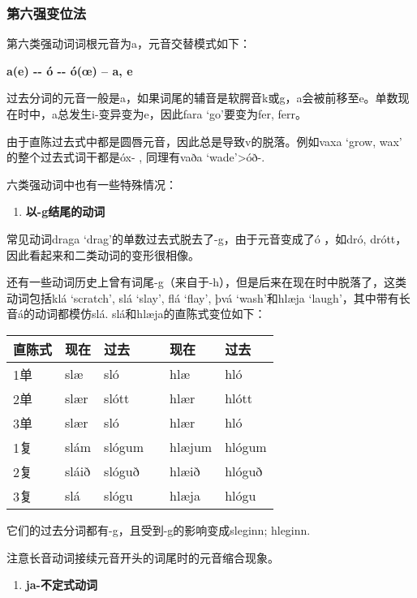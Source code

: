 \subsubsection{第六强变位法}\label{ux7b2cux516dux5f3aux53d8ux4f4dux6cd5}

第六类强动词词根元音为a，元音交替模式如下：

\textbf{a(e) -\/- ó -\/- ó(œ) -- a, e}

过去分词的元音一般是a，如果词尾的辅音是软腭音k或g，a会被前移至e。单数现在时中，a总发生i-变异变为e，因此fara
`go‌'要变为fer, ferr。

由于直陈过去式中都是圆唇元音，因此总是导致v的脱落。例如vaxa `grow, wax‌'
的整个过去式词干都是óx- , 同理有vaða `wade‌'\textgreater óð-.

六类强动词中也有一些特殊情况：

\begin{enumerate}
\def\labelenumi{\arabic{enumi})}
\item
  \textbf{以-g结尾的动词}
\end{enumerate}

常见动词draga `drag‌'的单数过去式脱去了-g，由于元音变成了ó ，如dró,
drótt，因此看起来和二类动词的变形很相像。

还有一些动词历史上曾有词尾-g（来自于-h），但是后来在现在时中脱落了，这类动词包括klá
`scratch', slá `slay', flá `flay', þvá `wash'和hlæja
`laugh‌'，其中带有长音á的动词都模仿slá. slá和hlæja的直陈式变位如下：

\begin{longtable}{llllll}
\toprule
直陈式 & 现在 & 过去 &  & 现在 & 过去 \\
\midrule
\endhead
\bottomrule
\endfoot
1单 & slæ & sló & & hlæ & hló \\
2单 & slær & slótt & & hlær & hlótt \\
3单 & slær & sló & & hlær & hló \\
1复 & slám & slógum & & hlæjum & hlógum \\
2复 & sláið & slóguð & & hlæið & hlóguð \\
3复 & slá & slógu & & hlæja & hlógu \\
\end{longtable}

它们的过去分词都有-g，且受到-g的影响变成sleginn; hleginn.

注意长音动词接续元音开头的词尾时的元音缩合现象。

\begin{enumerate}
\def\labelenumi{\arabic{enumi})}
\setcounter{enumi}{1}
\item
  \textbf{ja-不定式动词}
\end{enumerate}

